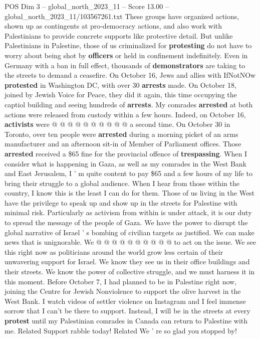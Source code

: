 \begin{textsample}{POS Dim 3 – global\_north\_2023\_11 – Score 13.00 – global\_north\_2023\_11/103567261.txt}
These groups have organized actions, shown up as contingents at pro-democracy actions, and also work with Palestinians to provide concrete supports like protective detail.
But unlike Palestinians in Palestine, those of us criminalized for \textbf{protesting} do not have to worry about being shot by \textbf{officers} or held in confinement indefinitely.
Even in Germany with a ban in full effect, thousands of \textbf{demonstrators} are taking to the streets to demand a ceasefire.
On October 16, Jews and allies with IfNotNOw \textbf{protested} in Washington DC, with over 30 \textbf{arrests} made.
On October 18, joined by Jewish Voice for Peace, they did it again, this time occupying the captiol building and seeing hundreds of \textbf{arrests}.
My comrades \textbf{arrested} at both actions were released from custody within a few hours.
Indeed, on October 16, \textbf{activists} were @ @ @ @ @ @ @ @ @ @ a second time.
On October 30 in Toronto, over ten people were \textbf{arrested} during a morning picket of an arms manufacturer and an afternoon sit-in of Member of Parliament offices.
Those \textbf{arrested} received a \$65 fine for the provincial offence of \textbf{trespassing}.
When I consider what is happening in Gaza, as well as my comrades in the West Bank and East Jerusalem, I ' m quite content to pay \$65 and a few hours of my life to bring their struggle to a global audience.
When I hear from those within the country, I know this is the least I can do for them.
Those of us living in the West have the privilege to speak up and show up in the streets for Palestine with minimal risk.
Particularly as activism from within is under attack, it is our duty to spread the message of the people of Gaza.
We have the power to disrupt the global narrative of Israel ' s bombing of civilian targets as justified.
We can make news that is unignorable.
We @ @ @ @ @ @ @ @ @ @ to act on the issue.
We see this right now as politicians around the world grow less certain of their unwavering support for Israel.
We know they see us in their office buildings and their streets.
We know the power of collective struggle, and we must harness it in this moment.
Before October 7, I had planned to be in Palestine right now, joining the Centre for Jewish Nonviolence to support the olive harvest in the West Bank.
I watch videos of settler violence on Instagram and I feel immense sorrow that I can't be there to support.
Instead, I will be in the streets at every \textbf{protest} until my Palestinian comrades in Canada can return to Palestine with me.
Related Support rabble today!
Related We ' re so glad you stopped by!

\end{textsample}

